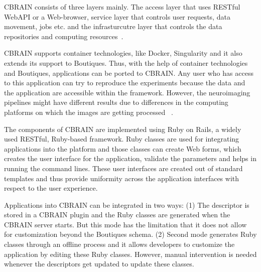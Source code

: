 
CBRAIN consists of three layers mainly. The access layer that uses RESTful WebAPI or a Web-browser, service layer that controls user requests, data movement, jobs etc. and the infrasturcutre layer that controls the data repositories and computing resources~\cite{DBLP:journals/fini/DasGRSPMSRSKMKR17}.

CBRAIN supports container technologies, like Docker, Singularity and it 
also extends its support to Boutiques. Thus, with the help of container 
technologies and Boutiques, applications can be ported to CBRAIN. Any 
user who has access to this application can try to reproduce the 
experiments because the data and the application are accessible within 
the framework. However, the neuroimaging pipelines 
might have different results due to differences in the computing platforms 
on which the images are getting processed 
~\cite{10.3389/conf.fninf.2014.18.00076}.

The components of CBRAIN are implemented using Ruby on Rails, a widely 
used RESTful, Ruby-based framework. Ruby classes are used for 
integrating applications into the platform and those classes can create 
Web forms, which creates the user interface for the application, 
validate the parameters and helps in running the command lines. These 
user interfaces are created out of standard templates and thus provide uniformity across the application interfaces with respect to 
the user experience.

Applications into CBRAIN can be integrated in two ways: (1) The 
descriptor is stored in a CBRAIN plugin and the Ruby classes are 
generated when the CBRAIN server starts. But this mode has the 
limitation that it does not allow for customization beyond the 
Boutiques schema. (2) Second mode generates Ruby classes through an 
offline process and it allows developers to customize the application 
by editing these Ruby classes. However, manual intervention is needed whenever the descriptors get 
updated to update these classes.

